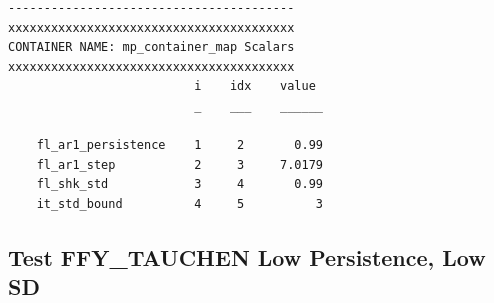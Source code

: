 \documentclass[
]{book}
\begin{document}
\begin{verbatim}
----------------------------------------
xxxxxxxxxxxxxxxxxxxxxxxxxxxxxxxxxxxxxxxx
CONTAINER NAME: mp_container_map Scalars
xxxxxxxxxxxxxxxxxxxxxxxxxxxxxxxxxxxxxxxx
                          i    idx    value 
                          _    ___    ______

    fl_ar1_persistence    1     2       0.99
    fl_ar1_step           2     3     7.0179
    fl_shk_std            3     4       0.99
    it_std_bound          4     5          3
\end{verbatim}

\hypertarget{test-ffy_tauchen-low-persistence-low-sd-1}{%
\subsection{Test FFY\_TAUCHEN Low Persistence, Low SD}\label{test-ffy_tauchen-low-persistence-low-sd-1}}
\end{document}
